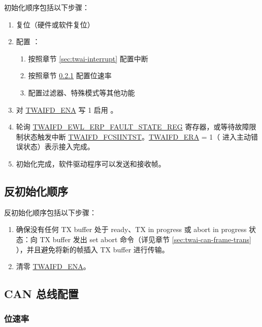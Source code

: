 \documentclass[main\_\_CN.tex]{subfiles}
\begin{document}
初始化顺序包括以下步骤：

\begin{enumerate}
    \item 复位（硬件或软件复位）
    \item 配置 \modulename{}：
    \begin{enumerate}
        \item 按照章节 \ref{sec:twai-interrupt} \textit{} 配置中断
        \item 按照章节 \ref{sec:twai-func-bit-rate} \textit{} 配置位速率
        \item 配置过滤器、特殊模式等其他功能
    \end{enumerate}
    \item 对 \hyperref[fielddesc:TWAIFDENA]{TWAIFD\_ENA} 写 1 启用 \modulename{}。
    \item 轮询 \hyperref[regdesc:TWAIFDEWLERPFAULTSTATEREG]{TWAIFD\_EWL\_ERP\_FAULT\_STATE\_REG} 寄存器，或等待故障限制状态触发中断 \hyperref[fielddesc:TWAIFDFCSIINTST]{TWAIFD\_FCSIINTST}。\hyperref[fielddesc:TWAIFDERA]{TWAIFD\_ERA} = 1（\modulename{} 进入主动错误状态）表示接入完成。
    \item 初始化完成，软件驱动程序可以发送和接收帧。
\end{enumerate}

\subsection{反初始化顺序}

反初始化顺序包括以下步骤：

\begin{enumerate}
    \item 确保没有任何 TX buffer 处于 ready、TX in progress 或 abort in progress 状态：向 TX buffer 发出 set abort 命令（详见章节 \ref{sec:twai-can-frame-trans} \textit{}），并且避免将新的帧插入 TX buffer 进行传输。
    \item 清零 \hyperref[fielddesc:TWAIFDENA]{TWAIFD\_ENA}。
\end{enumerate}

\subsection{CAN 总线配置\label{sec:twai-func-bus-config}}

\subsubsection{位速率}
\label{sec:twai-func-bit-rate}
\end{document}
